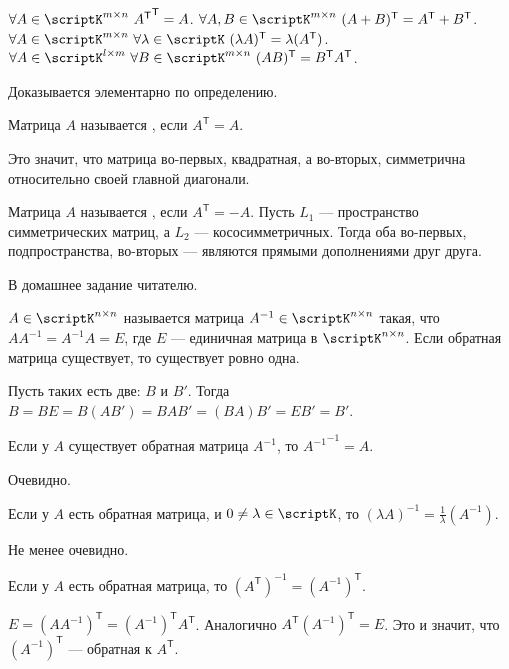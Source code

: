 \documentclass{article}
\newcommand*{\trans}{^{\mathsf T}}
\begin{document}
\begin{itemize}
        \thm $\forall A\in\scriptK^{m\times n}~{A\trans}\trans=A$.
        \thm $\forall A,B\in\scriptK^{m\times n}~(A+B)\trans=A\trans+B\trans$.
        \thm $\forall A\in\scriptK^{m\times n}~\forall\lambda\in\scriptK~(\lambda A)\trans=\lambda(A\trans)$.
        \thm $\forall A\in\scriptK^{l\times m}~\forall B\in\scriptK^{m\times n}~(AB)\trans=B\trans A\trans$.
        \begin{Proof}
            Доказывается элементарно по определению.
        \end{Proof}
        \dfn Матрица $A$ называется , если $A\trans=A$.
        \begin{Comment}
            Это значит, что матрица во-первых, квадратная, а во-вторых, симметрична относительно своей главной диагонали.
        \end{Comment}
        \dfn Матрица $A$ называется , если $A\trans=-A$.
        \thm Пусть $L_1$ --- пространство симметрических матриц, а $L_2$ --- кососимметричных. Тогда оба во-первых, подпространства, во-вторых --- являются прямыми дополнениями друг друга.
        \begin{Proof}
            В домашнее задание читателю.
        \end{Proof}
        \dfn {} $A\in\scriptK^{n\times n}$ называется матрица $A^{-1}\in\scriptK^{n\times n}$ такая, что $AA^{-1}=A^{-1}A=E$, где $E$ --- единичная матрица в $\scriptK^{n\times n}$.
        \thm Если обратная матрица существует, то существует ровно одна.
        \begin{Proof}
            Пусть таких есть две: $B$ и $B'$. Тогда $B=BE=B(AB')=BAB'=(BA)B'=EB'=B'$.
        \end{Proof}
        \thm Если у $A$ существует обратная матрица $A^{-1}$, то ${A^{-1}}^{-1}=A$.
        \begin{Proof}
            Очевидно.
        \end{Proof}
        \thm Если у $A$ есть обратная матрица, и $0\neq\lambda\in\scriptK$, то $(\lambda A)^{-1}=\frac1\lambda(A^{-1})$.
        \begin{Proof}
            Не менее очевидно.
        \end{Proof}
        \thm Если у $A$ есть обратная матрица, то $(A\trans)^{-1}=(A^{-1})\trans$.
        \begin{Proof}
            $E=(AA^{-1})\trans=(A^{-1})\trans A\trans$. Аналогично $A\trans(A^{-1})\trans=E$. Это и значит, что $(A^{-1})\trans$ --- обратная к $A\trans$.

\end{Proof}
\end{itemize}
\end{document}
